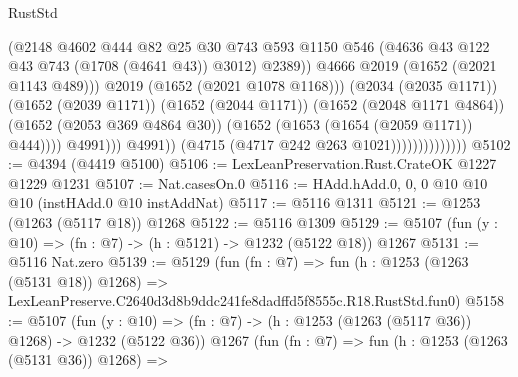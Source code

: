 \begin{lexlean}{RustStd}
\begin{coremodule}
                                                (@2148
                                                  @4602
                                                  @444
                                                  @82
                                                  @25
                                                  @30
                                                  @743
                                                  @593
                                                  @1150
                                                  @546
                                                  (@4636
                                                    @43
                                                    @122
                                                    @43
                                                    @743
                                                    (@1708 (@4641 @43))
                                                    @3012)
                                                  @2389))
                                              @4666
                                              @2019
                                              (@1652 (@2021 @1143 @489)))
                                            @2019
                                            (@1652 (@2021 @1078 @1168)))
                                          (@2034 (@2035 @1171))
                                          (@1652 (@2039 @1171))
                                          (@1652 (@2044 @1171))
                                          (@1652 (@2048 @1171 @4864))
                                          (@1652 (@2053 @369 @4864 @30))
                                          (@1652 (@1653 (@1654 (@2059 @1171)) @444))))
                                      @4991)))
                                @4991))
                            (@4715 (@4717 @242 @263 @1021))))))))))))))
@5102 := @4394 (@4419 @5100)
@5106 := LexLeanPreservation.Rust.CrateOK @1227 @1229 @1231
@5107 := Nat.casesOn.{0}
@5116 := HAdd.hAdd.{0, 0, 0} @10 @10 @10 (instHAdd.{0} @10 instAddNat)
@5117 := @5116 @1311
@5121 := @1253 (@1263 (@5117 @18)) @1268
@5122 := @5116 @1309
@5129 := @5107 (fun (y : @10) => (fn : @7) -> (h : @5121) -> @1232 (@5122 @18)) @1267
@5131 := @5116 Nat.zero
@5139 := @5129
    (fun (fn : @7) =>
    fun (h : @1253 (@1263 (@5131 @18)) @1268) =>
    LexLeanPreserve.C2640d3d8b9ddc241fe8dadffd5f8555c.R18.RustStd.fun0)
@5158 := @5107
    (fun (y : @10) => (fn : @7) -> (h : @1253 (@1263 (@5117 @36)) @1268) -> @1232 (@5122 @36))
    @1267
    (fun (fn : @7) =>
    fun (h : @1253 (@1263 (@5131 @36)) @1268) =>

\end{coremodule}
\end{lexlean}
